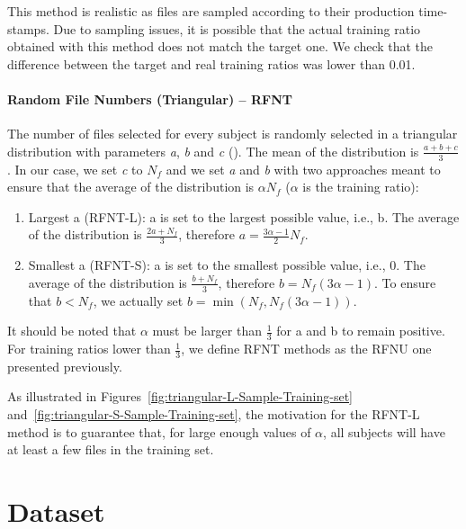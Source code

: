 \documentclass[10pt, conference, compsocconf]{IEEEtran}
\newcommand{\todo}[1]{\marginpar{\parbox{18mm}{\flushleft\tiny\color{red}\textbf{TODO}:
      #1}}}
\begin{document}
This method is realistic as files are sampled according to their production time-stamps.
Due to sampling issues, it is possible that the actual training ratio obtained with this method
does not match the target one. We check that the difference between the target and real training ratios
was lower than 0.01.\\ 

\paragraph{Random File Numbers (Triangular) -- RFNT}
The number of files selected for every subject is randomly selected in
a triangular distribution with parameters \textit{a}, \textit{b} and 
\textit{c} (\todo{see Figure X}). The mean of the distribution is 
$\frac{a+b+c}{3}$. In our case, we set \textit{c} to $N_{f}$ and we set 
\textit{a} and \textit{b} with two approaches meant to ensure that the 
average of the distribution is $\alpha N_{f}$ ($\alpha$ is the training 
ratio):
\begin{enumerate}
        \item Largest a (RFNT-L): a is set to the 
        largest possible value, i.e., b. The average of the 
        distribution is $\frac{2a+N_{f}}{3}$, therefore 
        $a=\frac{3\alpha-1}{2}N_{f}$.
                \item Smallest a (RFNT-S): a is 
        set to the smallest possible value, i.e., 0. The average of the 
        distribution is $\frac{b+N_{f}}{3}$, therefore 
        $b=N_{f}(3\alpha-1)$. To ensure that $b<N_{f}$, we actually set 
        $b=\min(N_{f}, N_{f}(3\alpha-1))$. 
\end{enumerate}
It should be noted that $\alpha$ must be larger than $\frac{1}{3}$ for 
a and b to remain positive. For training ratios lower than $\frac{1}{3}$, we 
define RFNT methods as the RFNU one presented previously.

As illustrated in Figures~\ref{fig:triangular-L-Sample-Training-set} 
and~\ref{fig:triangular-S-Sample-Training-set}, the motivation for the 
RFNT-L method is to guarantee that, for large enough values of 
$\alpha$, all subjects will have at least a few files in the training 
set.

\section{Dataset}
\end{document}
